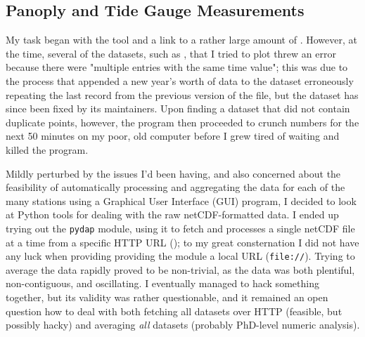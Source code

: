 \documentclass{article}
\begin{document}
\subsection{Panoply and Tide Gauge Measurements}
My task began with the  tool and a link to a rather large amount of .  However, at the time, several of the datasets, such as , that I tried to plot threw an error because there were "multiple entries with the same time value"; this was due to the process that appended a new year's worth of data to the dataset erroneously repeating the last record from the previous version of the file, but the dataset has since been fixed by its maintainers.  Upon finding a dataset that did not contain duplicate points, however, the program then proceeded to crunch numbers for the next 50 minutes on my poor, old computer before I grew tired of waiting and killed the program.

Mildly perturbed by the issues I'd been having, and also concerned about the feasibility of automatically processing and aggregating the data for each of the many stations using a Graphical User Interface (GUI) program, I decided to look at Python tools for dealing with the raw netCDF-formatted data.  I ended up trying out the \texttt{pydap} module, using it to fetch and processes a single netCDF file at a time from a specific HTTP URL (); to my great consternation I did not have any luck when providing providing the module a local URL (\texttt{file://}).  Trying to average the data rapidly proved to be non-trivial, as the data was both plentiful, non-contiguous, and oscillating.  I eventually managed to hack something together, but its validity was rather questionable, and it remained an open question how to deal with both fetching all datasets over HTTP (feasible, but possibly hacky) and averaging \emph{all} datasets (probably PhD-level numeric analysis).
\end{document}
